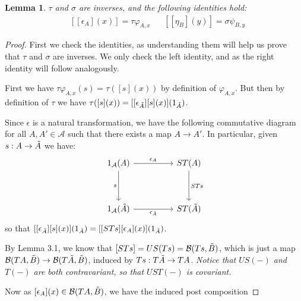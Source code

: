 \documentclass[12pt,a4paper]{article}
\newtheorem{lemma}{Lemma}[section] %
\def\HomB{\ensuremath\mathcal{B}}
\def\t{\ensuremath\tilde}
\begin{document}
\begin{lemma}
	$\tau$ and $\sigma$ are inverses, and the following identities hold:
	\begin{align*}
		&[[\epsilon_A](x)] = \tau \varphi_{A,x}& & [[\eta_B](y)]= \sigma \psi_{B,y}
	\end{align*}
\end{lemma}
\begin{proof}
	First we check the identities, as understanding them will help us prove that $\tau$ and $\sigma$ are inverses. We only check the left identity, and as the right identity will follow analogously. 
	
	First we have $\tau \varphi_{A,x}(s) = \tau([s](x))$ by definition of $\varphi_{A,x}$. But then by definition of $\tau$ we have $\tau([s](x)) = [[\epsilon_{\t A}][s](x)](1_{\t A})$. 
	
	Since $\epsilon$ is a natural transformation, we have the following commutative diagram for all $A, A' \in \mathcal{A}$ such that there exists a map $A \to A'$. In particular, given $s: A \to \t A$ we have:
\[\begin{tikzcd}
	{1_\mathcal{A}(A)} && {ST(A)} \\
	\\
	{1_\mathcal{A}(\t A)} && {ST(\t A)}
	\arrow["{\epsilon_A}", from=1-1, to=1-3]
	\arrow["s"', from=1-1, to=3-1]
	\arrow["STs", from=1-3, to=3-3]
	\arrow["{\epsilon_{\t A}}"', from=3-1, to=3-3]
\end{tikzcd}\]
so that $[[\epsilon_{\t A}][s](x)](1_{\t A}) = [[STs][\epsilon_A](x)](1_{\t A})$. 

By Lemma 3.1, we know that $[STs] = US(Ts)  = \HomB(Ts, \t B)$, which is just a map  $\HomB(TA, \t B) \to \HomB(T\t A, \t B)$, induced by $Ts: T\t A \to TA$. \emph{Notice that $US(-)$ and $T(-)$ are both contravariant, so that $UST(-)$ is covariant. }

Now as  $[\epsilon_A](x) \in \HomB(TA, \t B)$, we have the induced post composition


\end{proof}
\end{document}
